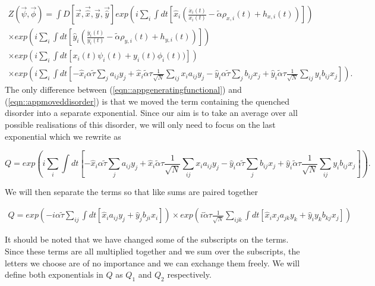 \documentclass[.../main.tex]{subfiles}
\begin{document}
	\begin{equation}
	\begin{split}
	\label{eqn::appmoveddisorder}
		Z(\Vec{\psi}, \Vec{\phi}) = \int D[\Vec{x}, \Vec{\hat{x}}, \Vec{y}, \Vec{\hat{y}}] exp(i
		\sum_i \int dt[\hat{x}_i
		(\frac{\dot{x_i}(t)}{x_i(t)}
			- \tilde{\alpha} \rho_{x, i}(t)+ h_{x, i}(t))]) 
			\\
			\times exp(i \sum_i \int dt[\hat{y}_i
		(\frac{\dot{y_i}(t)}{y_i(t)} 
			- \tilde{\alpha} \rho_{y, i}(t) + h_{y, i}(t))])\\
			\times exp(i \sum_i
		\int dt[x_i(t) \psi_i(t) + y_i(t) \phi_i(t))])\\
		\times exp(i \sum_i \int dt[- \hat{x}_i \alpha \tilde{\tau} \sum_{j} a_
			{ij} 
			y_j +
			\hat{x}_i \tilde{\alpha} \tau \frac{1}{\sqrt{N}} \sum_{i j} x_i a_{ij} y_j - \hat{y}_i
			\alpha 
			\tilde{\tau} \sum_{j} b_
			{ij} 
			x_j +
			\hat{y}_i \tilde{\alpha} \tau \frac{1}{\sqrt{N}} \sum_{i j} y_i b_{ij} x_j]).
	\end{split}
	\end{equation}
	The only difference between (\ref{eqn::appgeneratingfunctional}) and (\ref{eqn::appmoveddisorder}) is
	that we moved the term containing the quenched disorder into a separate exponential. Since our
	aim is to take an average over all possible realisations of this disorder, we will only need to
	focus on the last exponential which we rewrite as

	\begin{equation}
		Q = exp(i \sum_i \int dt[- \hat{x}_i \alpha \tilde{\tau} \sum_{j} a_
			{ij} 
			y_j +
			\hat{x}_i \tilde{\alpha} \tau \frac{1}{\sqrt{N}} \sum_{i j} x_i a_{ij} y_j - \hat{y}_i
			\alpha 
			\tilde{\tau} \sum_{j} b_
			{ij} 
			x_j +
			\hat{y}_i \tilde{\alpha} \tau \frac{1}{\sqrt{N}} \sum_{i j} y_i b_{ij} x_j]).
	\end{equation}

	We will then separate the terms so that like sums are paired together

	\begin{equation}
	\begin{split}
		Q = exp(-i \alpha \tilde{\tau} \sum_{ij} \int dt[\hat{x}_i a_{ij} y_j + \hat{y}_j b_
			{ji} 
			x_i])
			\times
			exp(i \tilde{\alpha} \tau \frac{1}{\sqrt{N}} \sum_{ijk} \int dt[\hat{x}_i x_j
			a_{jk} y_k + \hat{y}_i y_k b_{kj} x_j])
	\end{split}
	\end{equation}

	It should be noted that we have changed some of the subscripts on the terms. Since these terms
	are all multiplied together and we sum over the subscripts, the letters we choose are of no
	importance and we can exchange them freely. We will define both exponentials in $Q$ as $Q_1$ and
	$Q_2$ respectively.
\end{document}
